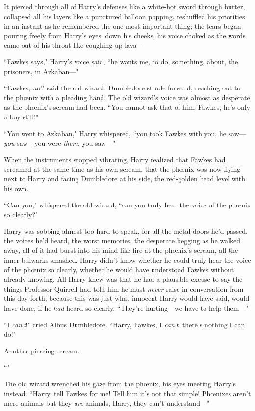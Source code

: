 It pierced through all of Harry's defenses like a white-hot sword through butter, collapsed all his layers like a punctured balloon popping, reshuffled his priorities in an instant as he remembered the one most important thing; the tears began pouring freely from Harry's eyes, down his cheeks, his voice choked as the words came out of his throat like coughing up lava—

``Fawkes says," Harry's voice said, ``he wants me, to do, something, about, the prisoners, in Azkaban—"

``Fawkes, \emph{no}!" said the old wizard. Dumbledore strode forward, reaching out to the phœnix with a pleading hand. The old wizard's voice was almost as desperate as the phœnix's scream had been. ``You cannot ask that of him, Fawkes, he's only a boy still!"

``You went to Azkaban," Harry whispered, ``you took Fawkes with you, he saw—\emph{you} saw—you were \emph{there}, you saw—"

When the instruments stopped vibrating, Harry realized that Fawkes had screamed at the same time as his own scream, that the phœnix was now flying next to Harry and facing Dumbledore at his side, the red-golden head level with his own.

``Can you," whispered the old wizard, ``can you truly hear the voice of the phœnix so clearly?"

Harry was sobbing almost too hard to speak, for all the metal doors he'd passed, the voices he'd heard, the worst memories, the desperate begging as he walked away, all of it had burst into his mind like fire at the phœnix's scream, all the inner bulwarks smashed. Harry didn't know whether he could truly hear the voice of the phœnix so clearly, whether he would have understood Fawkes without already knowing. All Harry knew was that he had a plausible excuse to say the things Professor Quirrell had told him he must \emph{never} raise in conversation from this day forth; because this was just what innocent-Harry would have said, would have done, if he \emph{had} heard so clearly. ``They're hurting—we have to help them—"

``I \emph{can't}!" cried Albus Dumbledore. ``Harry, Fawkes, I \emph{can't}, there's nothing I can do!"

Another piercing scream.

``"

The old wizard wrenched his gaze from the phœnix, his eyes meeting Harry's instead. ``Harry, tell Fawkes for me! Tell him it's not that simple! Phœnixes aren't mere animals but they \emph{are} animals, Harry, they can't understand—"

